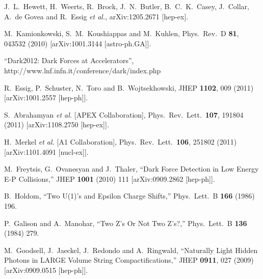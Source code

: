 
  J.~L.~Hewett, H.~Weerts, R.~Brock, J.~N.~Butler, B.~C.~K.~Casey, J.~Collar, A.~de Govea and R.~Essig {\it et al.}, arXiv:1205.2671 [hep-ex].
  

  M.~Kamionkowski, S.~M.~Koushiappas and M.~Kuhlen,
  Phys.\ Rev.\ D {\bf 81}, 043532 (2010)
  [arXiv:1001.3144 [astro-ph.GA]].

  ``Dark2012: Dark Forces at Accelerators'', http://www.lnf.infn.it/conference/dark/index.php


  R.~Essig, P.~Schuster, N.~Toro and B.~Wojtsekhowski,
  JHEP {\bf 1102}, 009 (2011)
  [arXiv:1001.2557 [hep-ph]].

  S.~Abrahamyan {\it et al.}  [APEX Collaboration],
  Phys.\ Rev.\ Lett.\  {\bf 107}, 191804 (2011)
  [arXiv:1108.2750 [hep-ex]].

  H.~Merkel {\it et al.}  [A1 Collaboration],
  Phys.\ Rev.\ Lett.\  {\bf 106}, 251802 (2011)
  [arXiv:1101.4091 [nucl-ex]].

M.~Freytsis, G.~Ovanesyan and J.~Thaler,
``Dark Force Detection in Low Energy E-P Collisions,''
JHEP {\bf 1001} (2010) 111
[arXiv:0909.2862 [hep-ph]].

B.~Holdom,
``Two U(1)'s and Epsilon Charge Shifts,''
Phys.\ Lett.\ B {\bf 166} (1986) 196.

P.~Galison and A.~Manohar,
``Two Z's Or Not Two Z's?,''
Phys.\ Lett.\ B {\bf 136} (1984) 279.

 M.~Goodsell, J.~Jaeckel, J.~Redondo and A.~Ringwald,
 ``Naturally Light Hidden Photons in LARGE Volume String Compactifications,''
 JHEP {\bf 0911}, 027 (2009)
 [arXiv:0909.0515 [hep-ph]].
 

